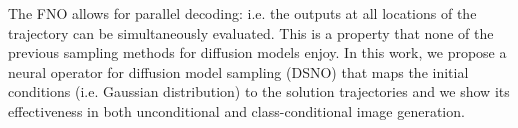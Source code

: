 The FNO allows for parallel decoding: i.e. the outputs at all locations of the trajectory can be simultaneously evaluated. This is a property that none of the previous sampling methods for diffusion models enjoy.   
In this work, we propose a neural operator for diffusion model sampling (DSNO) that maps the initial conditions (i.e. Gaussian distribution) to the solution trajectories and we show its effectiveness in both unconditional and class-conditional image generation. 




